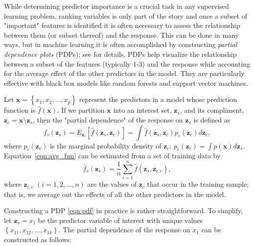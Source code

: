 \documentclass{article}
\begin{document}
While determining predictor importance is a crucial task in any supervised learning problem, ranking variables is only part of the story and once a subset of "important" features is identified it is often necessary to assess the relationship between them (or subset thereof) and the response. This can be done in many ways, but in machine learning it is often accomplished by constructing \textit{partial dependence plots} (PDPs); see \citet{friedman-2001-greedy} for details. PDPs help visualize the relationship between a subset of the features (typically 1-3) and the response while accounting for the average effect of the other predictors in the model. They are particularly effective with black box models like random forests and support vector machines.

Let $\boldsymbol{x} = \left\{x_1, x_2, \dots, x_p\right\}$ represent the predictors in a model whose prediction function is $\widehat{f}\left(\boldsymbol{x}\right)$. If we partition $\boldsymbol{x}$ into an interest set, $\boldsymbol{z}_s$, and its compliment, $\boldsymbol{z}_c = \boldsymbol{x} \setminus \boldsymbol{z}_s$, then the "partial dependence" of the response on $\boldsymbol{z}_s$ is defined as
\begin{equation}
\label{eqn:avg_fun}
  f_s\left(\boldsymbol{z}_s\right) = E_{\boldsymbol{z}_c}\left[\widehat{f}\left(\boldsymbol{z}_s, \boldsymbol{z}_c\right)\right] = \int \widehat{f}\left(\boldsymbol{z}_s, \boldsymbol{z}_c\right)p_{c}\left(\boldsymbol{z}_c\right)d\boldsymbol{z}_c,
\end{equation}
where $p_{c}\left(\boldsymbol{z}_c\right)$ is the marginal probability density of $\boldsymbol{z}_c$: $p_{c}\left(\boldsymbol{z}_c\right) = \int p\left(\boldsymbol{x}\right)d\boldsymbol{z}_s$.
Equation~\eqref{eqn:avg_fun} can be estimated from a set of training data by
\begin{equation}
\label{eqn:pdf}
\bar{f}_s\left(\boldsymbol{z}_s\right) = \frac{1}{n}\sum_{i = 1}^n\widehat{f}\left(\boldsymbol{z}_s,\boldsymbol{z}_{i, c}\right),
\end{equation}
where $\boldsymbol{z}_{i, c}$ $\left(i = 1, 2, \dots, n\right)$ are the values of $\boldsymbol{z}_c$ that occur in the training sample; that is, we average out the effects of all the other predictors in the model.

Constructing a PDP \eqref{eqn:pdf} in practice is rather straightforward. To simplify, let $\boldsymbol{z}_s = x_1$ be the predictor variable of interest with unique values $\left\{x_{11}, x_{12}, \dots, x_{1k}\right\}$. The partial dependence of the response on $x_1$ can be constructed as follows:
\end{document}
